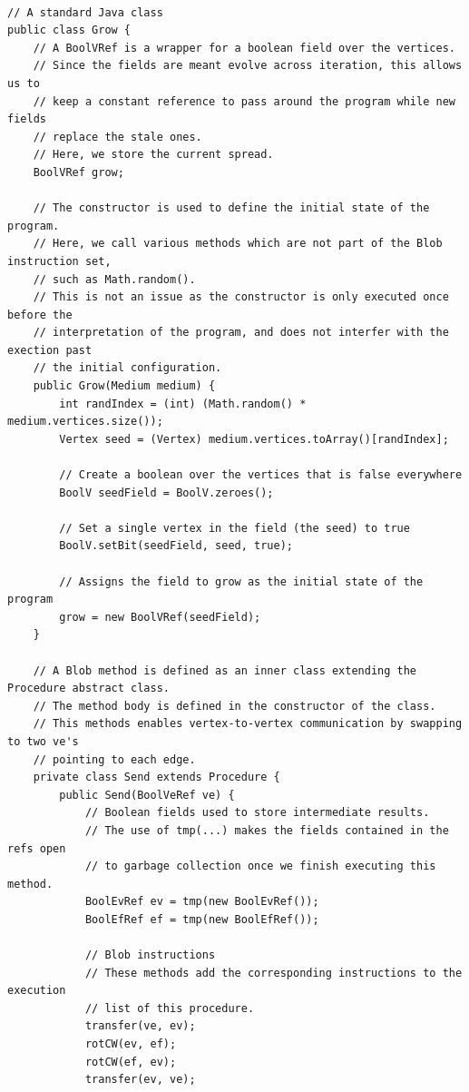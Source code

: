 \documentclass[11pt,a4paper]{report}
\begin{document}
\begin{verbatim}

// A standard Java class
public class Grow {
    // A BoolVRef is a wrapper for a boolean field over the vertices.
    // Since the fields are meant evolve across iteration, this allows us to
    // keep a constant reference to pass around the program while new fields 
    // replace the stale ones.
    // Here, we store the current spread.
    BoolVRef grow;
    
    // The constructor is used to define the initial state of the program.
    // Here, we call various methods which are not part of the Blob instruction set, 
    // such as Math.random().
    // This is not an issue as the constructor is only executed once before the
    // interpretation of the program, and does not interfer with the exection past 
    // the initial configuration.
    public Grow(Medium medium) {
        int randIndex = (int) (Math.random() * medium.vertices.size());
        Vertex seed = (Vertex) medium.vertices.toArray()[randIndex];
        
        // Create a boolean over the vertices that is false everywhere
        BoolV seedField = BoolV.zeroes();
        
        // Set a single vertex in the field (the seed) to true
        BoolV.setBit(seedField, seed, true);
        
        // Assigns the field to grow as the initial state of the program
        grow = new BoolVRef(seedField);         
    }
    
    // A Blob method is defined as an inner class extending the Procedure abstract class.
    // The method body is defined in the constructor of the class.
    // This methods enables vertex-to-vertex communication by swapping to two ve's
    // pointing to each edge.
    private class Send extends Procedure {
        public Send(BoolVeRef ve) {
            // Boolean fields used to store intermediate results.
            // The use of tmp(...) makes the fields contained in the refs open
            // to garbage collection once we finish executing this method.
            BoolEvRef ev = tmp(new BoolEvRef());
            BoolEfRef ef = tmp(new BoolEfRef());
            
            // Blob instructions
            // These methods add the corresponding instructions to the execution
            // list of this procedure. 
            transfer(ve, ev);
            rotCW(ev, ef);
            rotCW(ef, ev);
            transfer(ev, ve);
            

\end{verbatim}
\end{document}
